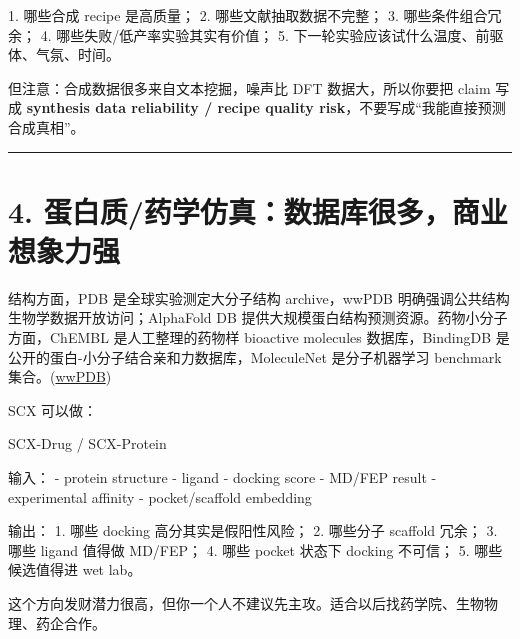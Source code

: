 \documentclass[
  12pt,
]{ctexart}
\newenvironment{Shaded}{}{}
\newcommand{\NormalTok}[1]{#1}
\begin{document}
\begin{Shaded}
\begin{Highlighting}[]
\NormalTok{1. 哪些合成 recipe 是高质量；}
\NormalTok{2. 哪些文献抽取数据不完整；}
\NormalTok{3. 哪些条件组合冗余；}
\NormalTok{4. 哪些失败/低产率实验其实有价值；}
\NormalTok{5. 下一轮实验应该试什么温度、前驱体、气氛、时间。}
\end{Highlighting}
\end{Shaded}

但注意：合成数据很多来自文本挖掘，噪声比 DFT 数据大，所以你要把 claim
写成 \textbf{synthesis data reliability / recipe quality
risk}，不要写成``我能直接预测合成真相''。

\begin{center}\rule{0.5\linewidth}{0.5pt}\end{center}

\section{4.
蛋白质/药学仿真：数据库很多，商业想象力强}\label{ux86cbux767dux8d28ux836fux5b66ux4effux771fux6570ux636eux5e93ux5f88ux591aux5546ux4e1aux60f3ux8c61ux529bux5f3a}

结构方面，PDB 是全球实验测定大分子结构 archive，wwPDB
明确强调公共结构生物学数据开放访问；AlphaFold DB
提供大规模蛋白结构预测资源。药物小分子方面，ChEMBL 是人工整理的药物样
bioactive molecules 数据库，BindingDB
是公开的蛋白-小分子结合亲和力数据库，MoleculeNet 是分子机器学习
benchmark
集合。(\href{https://www.wwpdb.org/?utm_source=chatgpt.com}{wwPDB})

SCX 可以做：

\begin{Shaded}
\begin{Highlighting}[]
\NormalTok{SCX{-}Drug / SCX{-}Protein}

\NormalTok{输入：}
\NormalTok{{-} protein structure}
\NormalTok{{-} ligand}
\NormalTok{{-} docking score}
\NormalTok{{-} MD/FEP result}
\NormalTok{{-} experimental affinity}
\NormalTok{{-} pocket/scaffold embedding}

\NormalTok{输出：}
\NormalTok{1. 哪些 docking 高分其实是假阳性风险；}
\NormalTok{2. 哪些分子 scaffold 冗余；}
\NormalTok{3. 哪些 ligand 值得做 MD/FEP；}
\NormalTok{4. 哪些 pocket 状态下 docking 不可信；}
\NormalTok{5. 哪些候选值得进 wet lab。}
\end{Highlighting}
\end{Shaded}

这个方向发财潜力很高，但你一个人不建议先主攻。适合以后找药学院、生物物理、药企合作。
\end{document}
